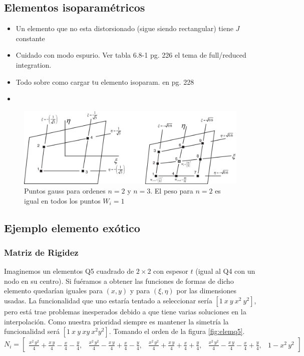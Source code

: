 \documentclass[11pt, a4paper,titlepage]{article}
\begin{document}
\subsection{Elementos isoparamétricos}
\begin{itemize}
    \item Un elemento que no esta distorsionado (sigue siendo rectangular) tiene $J$ constante
    \item Cuidado con modo espurio. Ver tabla 6.8-1 pg. 226 el tema de full/reduced integration.
    \item Todo sobre como cargar tu elemento isoparam. en pg. 228
    \item 
\end{itemize}

\begin{figure}[htb!]
    \centering
    \includegraphics[width=12cm]{fig/gauss_n3.eps}
    \caption{Puntos gauss para ordenes $n=2$ y $n=3$. El peso para $n=2$ es igual en todos los puntos $W_i=1$}
    \label{fig:gauss_n3}
\end{figure}
\subsection{Ejemplo elemento exótico}
\subsubsection*{Matriz de Rigidez}
Imaginemos un elementos Q5 cuadrado de $2\times2$ con espesor $t$  (igual al Q4 con un nodo en su centro). Si fuéramos a obtener las funciones de formas de dicho elemento quedarían iguales para $(x,y)$ y para $(\xi,\eta)$ por las dimensiones usadas. La funcionalidad que uno estaría tentado a seleccionar sería $[1\ x \ y\ x^2 \ y^2 ]$, pero está trae problemas inesperados debido a que tiene varias soluciones en la interpolación. Como nuestra prioridad siempre es mantener la simetría la funcionalidad será $[1\ x\ y\ xy\ x^2y^2 ]$.  Tomando el orden de la figura \ref{fig:elemq5}.
\[
N_i=\left[\begin{array}{ccccc} \frac{x^2\,y^2}{4}+\frac{x\,y}{4}-\frac{x}{4}-\frac{y}{4}, & \frac{x^2\,y^2}{4}-\frac{x\,y}{4}+\frac{x}{4}-\frac{y}{4}, & \frac{x^2\,y^2}{4}+\frac{x\,y}{4}+\frac{x}{4}+\frac{y}{4}, & \frac{x^2\,y^2}{4}-\frac{x\,y}{4}-\frac{x}{4}+\frac{y}{4}, & 1-x^2\,y^2 \end{array}\right]
\]
\end{document}
